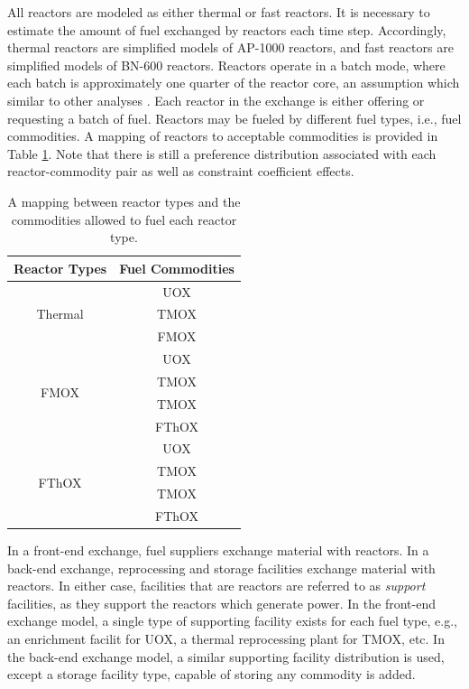 \documentclass{anstrans}
\begin{document}
All reactors are modeled as either thermal or fast reactors. It is necessary to
estimate the amount of fuel exchanged by reactors each time step. Accordingly,
thermal reactors are simplified models of AP-1000 reactors, and fast reactors
are simplified models of BN-600 reactors. Reactors operate in a batch mode,
where each batch is approximately one quarter of the reactor core, an assumption
which similar to other analyses \cite{rineiski2011reactivity}. Each reactor in
the exchange is either offering or requesting a batch of fuel. Reactors may be
fueled by different fuel types, i.e., fuel commodities. A mapping of reactors to
acceptable commodities is provided in Table \ref{tbl:rx_to_commods}. Note that
there is still a preference distribution associated with each reactor-commodity
pair as well as constraint coefficient effects.

\begin{table}[h!]
\centering
\caption{A mapping between reactor types and the commodities allowed to fuel 
  each reactor type.}
\label{tbl:rx_to_commods}
\begin{tabular}{|c|c|}
\hline
\textbf{Reactor Types}            & \textbf{Fuel Commodities} \\ \hline
\multirow{3}{*}{Thermal}                    & UOX         \\ 
                      & TMOX        \\  
                      & FMOX       \\ \hline
\multirow{4}{*}{FMOX}  & UOX         \\  
                      & TMOX        \\ 
                      & TMOX        \\  
                      & FThOX        \\ \hline 
\multirow{4}{*}{FThOX} & UOX         \\  
                     & TMOX        \\ 
                      & TMOX        \\  
                      & FThOX        \\ \hline 
\end{tabular}
\end{table}

In a front-end exchange, fuel suppliers exchange material with reactors. In a
back-end exchange, reprocessing and storage facilities exchange material with
reactors. In either case, facilities that are  reactors are referred
to as \textit{support} facilities, as they support the reactors which generate
power. In the front-end exchange model, a single type of supporting facility
exists for each fuel type, e.g., an enrichment facilit for UOX, a thermal
reprocessing plant for TMOX, etc. In the back-end exchange model, a similar
supporting facility distribution is used, except a storage facility type,
capable of storing any commodity is added.
\end{document}

